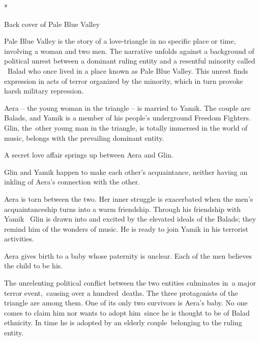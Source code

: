 \documentclass[letterpaper]{article}
\begin{document}
*


\bigskip

\textcolor[rgb]{0.13333334,0.13333334,0.13333334}{Back cover of Pale Blue Valley}


\bigskip

\textcolor[rgb]{0.13333334,0.13333334,0.13333334}{Pale Blue Valley is the story of a love-triangle in no specific place
or time, involving a woman and two men. The narrative unfolds against a background of political unrest between a
dominant ruling entity and a resentful minority called \ Balad who once lived in a place known as Pale Blue Valley.
This unrest finds expression in acts of terror organized by the minority, which in turn provoke harsh military
repression.}

\textcolor[rgb]{0.13333334,0.13333334,0.13333334}{Aera -- the young woman in the triangle -- is married to Yamik. The
couple are Balads, and Yamik is a member of his people's underground Freedom Fighters. Glin, the\ other young man in
the triangle, is totally immersed in the world of music, belongs with the prevailing dominant entity.\ \ }

\textcolor[rgb]{0.13333334,0.13333334,0.13333334}{A secret love affair springs up between Aera and Glin.\ \ }

\textcolor[rgb]{0.13333334,0.13333334,0.13333334}{Glin and Yamik happen to make each other's acquaintance, neither
having an inkling of Aera's connection with the other.}

\textcolor[rgb]{0.13333334,0.13333334,0.13333334}{Aera is torn between the two. Her inner struggle is exacerbated when
the men's acquaintanceship turns into a warm friendship. Through his friendship with Yamik \ Glin is drawn into and
excited by the elevated ideals of the Balads; they remind him of the wonders of music. He is ready to join Yamik in his
terrorist activities.}

\textcolor[rgb]{0.13333334,0.13333334,0.13333334}{Aera gives birth to a baby whose paternity is unclear. Each of the men
believes the child to be his.}

\textcolor[rgb]{0.13333334,0.13333334,0.13333334}{The unrelenting political conflict between the two entities culminates
in~a major terror event,\ causing over a hundred\ deaths. The three protagonists of the
{\textquotedbl}triangle{\textquotedbl} are among them. One of its only two survivors is Aera's baby. No one comes to
claim him nor wants to adopt him\ since he is thought to be of Balad ethnicity. In time he is adopted by an elderly
couple~belonging to the ruling entity. }
\end{document}
